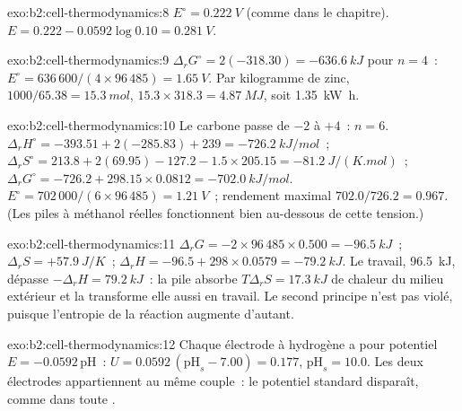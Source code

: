 \begin{solution}{exo:b2:cell-thermodynamics:8}
$E^\circ = \qty{0.222}{V}$ (comme dans le chapitre). $E = 0.222 - 0.0592\log 0.10 =
\qty{0.281}{V}$.
\end{solution}

\begin{solution}{exo:b2:cell-thermodynamics:9}
$\Delta_r G^\circ = 2(-318.30) = \qty{-636.6}{kJ}$ pour $n = 4$~: $E^\circ =
636\,600/(4 \times 96\,485) = \qty{1.65}{V}$. Par kilogramme de zinc, $1000/65.38 =
\qty{15.3}{mol}$, $15.3 \times 318.3 = \qty{4.87}{MJ}$, soit \qty{1.35}{kW.h}.
\end{solution}

\begin{solution}{exo:b2:cell-thermodynamics:10}
Le carbone passe de $-2$ à $+4$~: $n = 6$. $\Delta_r H^\circ = -393.51 + 2(-285.83) +
239 = \qty{-726.2}{kJ/mol}$~; $\Delta_r S^\circ = 213.8 + 2(69.95) - 127.2 - 1.5
\times 205.15 = \qty{-81.2}{J/(K.mol)}$~; $\Delta_r G^\circ = -726.2 + 298.15 \times
0.0812 = \qty{-702.0}{kJ/mol}$. $E^\circ = 702\,000/(6 \times 96\,485) =
\qty{1.21}{V}$~; rendement maximal $702.0/726.2 = 0.967$. (Les piles à méthanol réelles
fonctionnent bien au-dessous de cette tension.)
\end{solution}

\begin{solution}{exo:b2:cell-thermodynamics:11}
$\Delta_r G = -2 \times 96\,485 \times 0.500 = \qty{-96.5}{kJ}$~; $\Delta_r S = +\qty{57.9}{J/K}$~;
$\Delta_r H = -96.5 + 298 \times 0.0579 = \qty{-79.2}{kJ}$. Le travail, \qty{96.5}{kJ},
dépasse $-\Delta_r H = \qty{79.2}{kJ}$~: la pile absorbe $T\Delta_r S = \qty{17.3}{kJ}$
de chaleur du milieu extérieur et la transforme elle aussi en travail. Le second principe
n'est pas violé, puisque l'entropie de la réaction augmente d'autant.
\end{solution}

\begin{solution}{exo:b2:cell-thermodynamics:12}
Chaque électrode à hydrogène a pour potentiel $E = -0.0592\,\mathrm{pH}$~: $U = 0.0592\,(\mathrm{pH}_s -
7.00) = 0.177$, $\mathrm{pH}_s = 10.0$. Les deux électrodes appartiennent au même couple~:
le potentiel standard disparaît, comme dans toute .
\end{solution}

